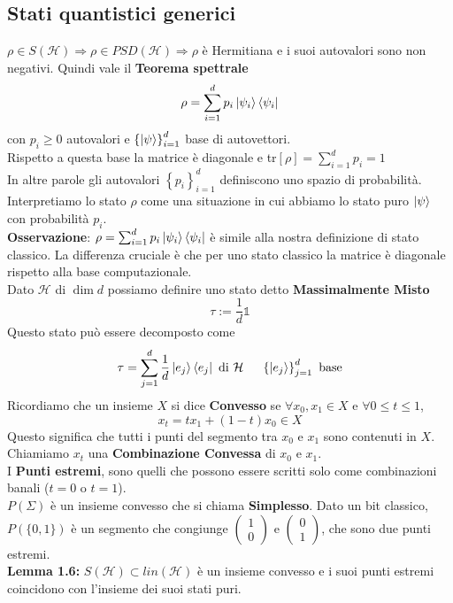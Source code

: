 \documentclass{report}
\begin{document}
\subsection{Stati quantistici generici}
$\rho \in S(\mathcal{H}) \Rightarrow \rho \in \textit{PSD}(\mathcal{H}) \Rightarrow \rho$ è Hermitiana e i suoi autovalori sono non negativi. Quindi vale il \textbf{Teorema spettrale}
$$\rho = \sum^d_{i=1}p_i \ket{\psi_i}\bra{\psi_i}$$
con $p_i\ge 0$ autovalori e $\left\{ \ket{\psi} \right\}^d_{i=1}$ base di autovettori.
\\Rispetto a questa base la matrice è diagonale e tr$[\rho] = \sum^d_{i=1} p_i = 1$
\\In altre parole gli autovalori $\left\{  p_i \right\}^d_{i=1}$ definiscono uno spazio di probabilità.
\\Interpretiamo lo stato $\rho$ come una situazione in cui abbiamo lo stato puro $\ket{\psi}$ con probabilità $p_i$.
\medskip
\\\textbf{Osservazione}: $\rho = \sum^d_{i=1} p_i \ket{\psi_i}\bra{\psi_i}$ è simile alla nostra definizione di stato classico. La differenza cruciale è che per uno stato classico la matrice è diagonale rispetto alla base computazionale.
\medskip
\\Dato $\mathcal{H}$ di $\dim d$ possiamo definire uno stato detto \textbf{Massimalmente Misto} $$\tau :=\frac{1}{d}\mathbb{1}$$
Questo stato può essere decomposto come
$$\tau = \sum^d_{j=1} \frac{1}{d} \ket{e_j}\bra{e_j} \text{ di } \mathcal{H} \hspace{0.5cm} \left\{ \ket{e_j} \right\}^d_{j=1} \text{ base}$$
Ricordiamo che un insieme $X$ si dice \textbf{Convesso} se $\forall x_0,x_1 \in X$ e $\forall 0 \le t\le 1$, 
$$x_t = tx_1 + (1-t)x_0 \in X$$
Questo significa che tutti i punti del segmento tra $x_0$ e $x_1$ sono contenuti in $X$. Chiamiamo $x_t$ una \textbf{Combinazione Convessa} di $x_0$ e $x_1$. 
\medskip
\\I \textbf{Punti estremi}, sono quelli che possono essere scritti solo come combinazioni banali ($t=0$ o $t=1$).
\medskip
\\$P(\Sigma)$ è un insieme convesso che si chiama \textbf{Simplesso}. Dato un bit classico, $P(\{0,1\})$ è un segmento che congiunge $\begin{pmatrix}
    1 \\ 0
\end{pmatrix}
\text{ e }
\begin{pmatrix}
    0\\1
\end{pmatrix}
$, che sono due punti estremi.
\medskip
\\ \textbf{Lemma 1.6:} $S(\mathcal{H}) \subset \textit{lin}(\mathcal{H})$ è un insieme convesso e i suoi punti estremi coincidono con l'insieme dei suoi stati puri.
\end{document}
